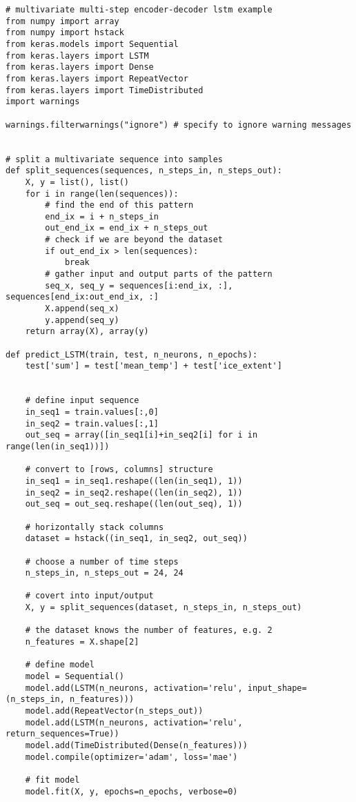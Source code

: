\begin{verbatim}
# multivariate multi-step encoder-decoder lstm example
from numpy import array
from numpy import hstack
from keras.models import Sequential
from keras.layers import LSTM
from keras.layers import Dense
from keras.layers import RepeatVector
from keras.layers import TimeDistributed
import warnings

warnings.filterwarnings("ignore") # specify to ignore warning messages


# split a multivariate sequence into samples
def split_sequences(sequences, n_steps_in, n_steps_out):
	X, y = list(), list()
	for i in range(len(sequences)):
		# find the end of this pattern
		end_ix = i + n_steps_in
		out_end_ix = end_ix + n_steps_out
		# check if we are beyond the dataset
		if out_end_ix > len(sequences):
			break
		# gather input and output parts of the pattern
		seq_x, seq_y = sequences[i:end_ix, :], sequences[end_ix:out_end_ix, :]
		X.append(seq_x)
		y.append(seq_y)
	return array(X), array(y)

def predict_LSTM(train, test, n_neurons, n_epochs):
    test['sum'] = test['mean_temp'] + test['ice_extent']


    # define input sequence
    in_seq1 = train.values[:,0]
    in_seq2 = train.values[:,1]
    out_seq = array([in_seq1[i]+in_seq2[i] for i in range(len(in_seq1))])

    # convert to [rows, columns] structure
    in_seq1 = in_seq1.reshape((len(in_seq1), 1))
    in_seq2 = in_seq2.reshape((len(in_seq2), 1))
    out_seq = out_seq.reshape((len(out_seq), 1))
    
    # horizontally stack columns
    dataset = hstack((in_seq1, in_seq2, out_seq))
    
    # choose a number of time steps
    n_steps_in, n_steps_out = 24, 24
    
    # covert into input/output
    X, y = split_sequences(dataset, n_steps_in, n_steps_out)
    
    # the dataset knows the number of features, e.g. 2
    n_features = X.shape[2]
    
    # define model
    model = Sequential()
    model.add(LSTM(n_neurons, activation='relu', input_shape=(n_steps_in, n_features)))
    model.add(RepeatVector(n_steps_out))
    model.add(LSTM(n_neurons, activation='relu', return_sequences=True))
    model.add(TimeDistributed(Dense(n_features)))
    model.compile(optimizer='adam', loss='mae')
    
    # fit model
    model.fit(X, y, epochs=n_epochs, verbose=0)
    

\end{verbatim}
